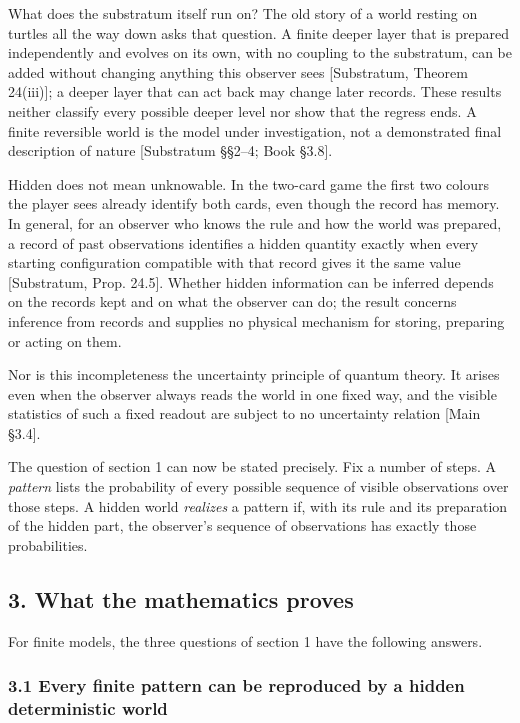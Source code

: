 \documentclass[
]{article}
\begin{document}
What does the substratum itself run on? The old story of a world resting
on turtles all the way down asks that question. A finite deeper layer
that is prepared independently and evolves on its own, with no coupling
to the substratum, can be added without changing anything this observer
sees {[}Substratum, Theorem 24(iii){]}; a deeper layer that can act back
may change later records. These results neither classify every possible
deeper level nor show that the regress ends. A finite reversible world
is the model under investigation, not a demonstrated final description
of nature {[}Substratum §§2--4; Book §3.8{]}.

Hidden does not mean unknowable. In the two-card game the first two
colours the player sees already identify both cards, even though the
record has memory. In general, for an observer who knows the rule and
how the world was prepared, a record of past observations identifies a
hidden quantity exactly when every starting configuration compatible
with that record gives it the same value {[}Substratum, Prop. 24.5{]}.
Whether hidden information can be inferred depends on the records kept
and on what the observer can do; the result concerns inference from
records and supplies no physical mechanism for storing, preparing or
acting on them.

Nor is this incompleteness the uncertainty principle of quantum theory.
It arises even when the observer always reads the world in one fixed
way, and the visible statistics of such a fixed readout are subject to
no uncertainty relation {[}Main §3.4{]}.

The question of section 1 can now be stated precisely. Fix a number of
steps. A \emph{pattern} lists the probability of every possible sequence
of visible observations over those steps. A hidden world \emph{realizes}
a pattern if, with its rule and its preparation of the hidden part, the
observer's sequence of observations has exactly those probabilities.

\hypertarget{what-the-mathematics-proves}{%
\subsection{3. What the mathematics
proves}\label{what-the-mathematics-proves}}

For finite models, the three questions of section 1 have the following
answers.

\hypertarget{every-finite-pattern-can-be-reproduced-by-a-hidden-deterministic-world}{%
\subsubsection{3.1 Every finite pattern can be reproduced by a hidden
deterministic
world}\label{every-finite-pattern-can-be-reproduced-by-a-hidden-deterministic-world}}
\end{document}
